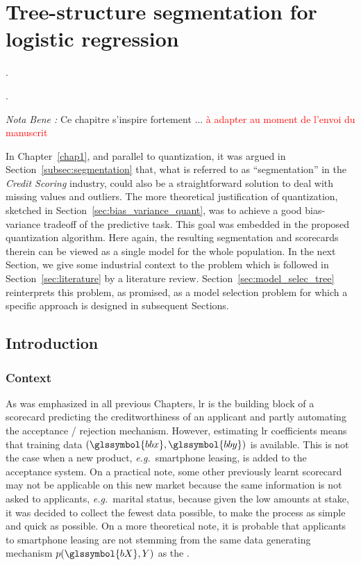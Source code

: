\chapter{Tree-structure segmentation for logistic regression} \label{chap6}

\epigraph{.}{.}

\minitoc


\textit{Nota Bene :} Ce chapitre s'inspire fortement ... \textcolor{red}{à adapter au moment de l'envoi du manuscrit}

\bigskip


In Chapter~\ref{chap1}, and parallel to quantization, it was argued in Section~\ref{subsec:segmentation} that, what is referred to as ``segmentation'' in the \textit{Credit Scoring} industry, could also be a straightforward solution to deal with missing values and outliers. The more theoretical justification of quantization, sketched in Section~\ref{sec:bias_variance_quant}, was to achieve a good bias-variance tradeoff of the predictive task. This goal was embedded in the proposed quantization algorithm. Here again, the resulting segmentation and scorecards therein can be viewed as a single model for the whole population. In the next Section, we give some industrial context to the problem which is followed in Section~\ref{sec:literature} by a literature review. Section~\ref{sec:model_selec_tree} reinterprets this problem, as promised, as a model selection problem for which a specific approach is designed in subsequent Sections.


\section{Introduction}

\subsection{Context}

As was emphasized in all previous Chapters, \gls{lr} is the building block of a scorecard predicting the creditworthiness of an applicant and partly automating the acceptance / rejection mechanism. However, estimating \gls{lr} coefficients means that training data $(\glssymbol{bbx},\glssymbol{bby})$ is available. This is not the case when a new product, \textit{e.g.}\ smartphone leasing, is added to the acceptance system. On a practical note, some other previously learnt scorecard may not be applicable on this new market because the same information is not asked to applicants, \textit{e.g.}\ marital status, because given the low amounts at stake, it was decided to collect the fewest data possible, to make the process as simple and quick as possible. On a more theoretical note, it is probable that applicants to smartphone leasing are not stemming from the same data generating mechanism $p(\glssymbol{bX},Y)$ as the .



